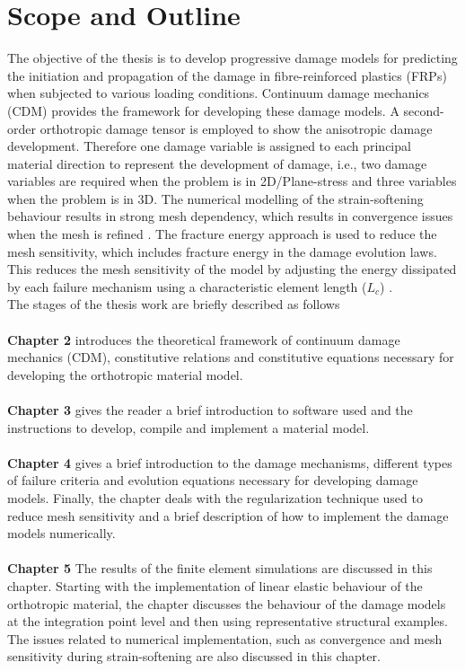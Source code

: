 \documentclass[12pt,a4paper,twoside,openright]{report}
\begin{document}
\section{Scope and Outline}
\indent\indent\indent  The objective of the thesis is to develop progressive damage models for predicting the initiation and propagation of the damage in fibre-reinforced plastics (FRPs) when subjected to various loading conditions. Continuum damage mechanics (CDM) provides the framework for developing these damage models. A second-order orthotropic damage tensor is employed to show the anisotropic damage development. Therefore one damage variable is assigned to each principal material direction to represent the development of damage, i.e., two damage variables are required when the problem is in 2D/Plane-stress and three variables when the problem is in 3D. The numerical modelling of the strain-softening behaviour results in strong mesh dependency, which results in convergence issues when the mesh is refined \citep{wang2009three}. The fracture energy approach is used to reduce the mesh sensitivity, which includes fracture energy in the damage evolution laws. This reduces the mesh sensitivity of the model by adjusting the energy dissipated by each failure mechanism using a characteristic element length ($L_{c}$) \citep{falzon2011numerical}.\\
The stages of the thesis work are briefly described as follows\\\\
\textbf{Chapter 2} introduces the theoretical framework of continuum damage mechanics (CDM), constitutive relations and constitutive equations necessary for developing the orthotropic material model. \\\\
\textbf{Chapter 3} gives the reader a brief introduction to software used and the instructions to develop, compile and implement a material model. \\\\
\textbf{Chapter 4} gives a brief introduction to the damage mechanisms, different types of failure criteria and evolution equations necessary for developing damage models. Finally, the chapter deals with the regularization technique used to reduce mesh sensitivity and a brief description of how to implement the damage models numerically. \\\\
\textbf{Chapter 5} The results of the finite element simulations are discussed in this chapter. Starting with the implementation of linear elastic behaviour of the orthotropic material, the chapter discusses the behaviour of the damage models at the integration point level and then using representative structural examples. The issues related to numerical implementation, such as convergence and mesh sensitivity during strain-softening are also discussed in this chapter.
\end{document}
